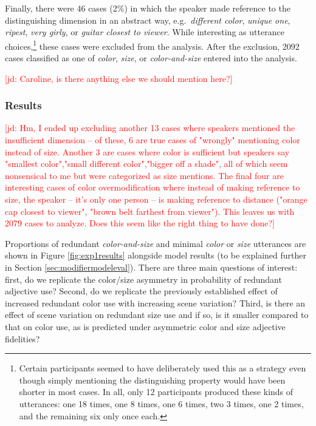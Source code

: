 \documentclass[11pt]{article}
\newcommand{\jd}[1]{\textcolor{Red}{[jd: #1]}}
\newcommand{\figref}[1]{Figure \ref{#1}}
\newcommand{\sectionref}[1]{Section \ref{#1}}
\begin{document}
Finally, there were 46 cases (2\%) in which the speaker made reference to the distinguishing dimension in an abstract way, e.g.~\emph{different color}, \emph{unique one}, \emph{ripest}, \emph{very girly}, or \emph{guitar closest to viewer}. While interesting as utterance choices,\footnote{Certain participants seemed to have deliberately used this as a strategy even though simply mentioning the distinguishing property would have been shorter in most cases. In all, only 12 participants produced these kinds of utterances: one 18 times, one 8 times, one 6 times, two 3 times, one 2 times, and the remaining six only once each.} these cases were excluded from the analysis. After the exclusion, 2092 cases classified as one of \emph{color}, \emph{size}, or \emph{color-and-size} entered into the analysis.

\jd{Caroline, is there anything else we should mention here?}

\subsubsection{Results}

\jd{Hm, I ended up excluding another 13 cases where speakers mentioned the insufficient dimension -- of these, 6 are true cases of "wrongly" mentioning color instead of size. Another 3 are cases where color is sufficient but speakers say "smallest color","small different color","bigger off a shade", all of which seem nonsensical to me but were categorized as size mentions. The final four are interesting cases of color overmodification where instead of making reference to size, the speaker -- it's only one person -- is making reference to distance ("orange cap closest to  viewer", "brown belt farthest from viewer"). This leaves us with 2079 cases to analyze. Does this seem like the right thing to have done?}

Proportions of redundant \emph{color-and-size} and minimal \emph{color} or \emph{size} utterances are shown in \figref{fig:exp1results} alongside model results (to be explained further in \sectionref{sec:modifiermodeleval}). There are three main questions of interest: first, do we replicate the color/size asymmetry in probability of redundant adjective use? Second, do we replicate the previously established effect of increased redundant color use with increasing scene variation? Third, is there an effect of scene variation on redundant size use and if so, is it smaller compared to that on color use, as is predicted under asymmetric color and size adjective fidelities?
\end{document}
